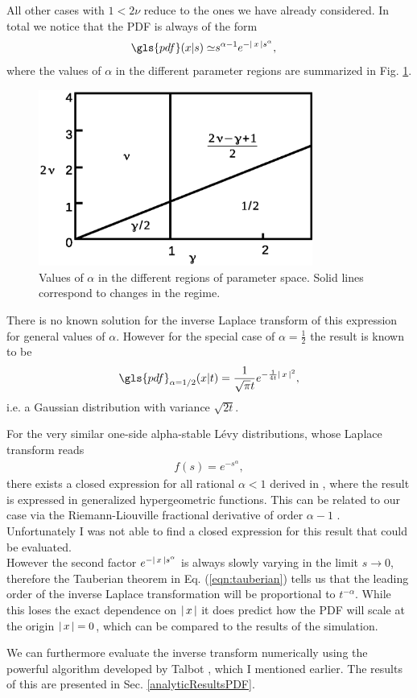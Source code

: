 All other cases with $1< 2\nu$ reduce to the ones we have already considered. In total we notice that the \gls{PDF} is always of the form 
%
\begin{align}
\gls{pdf}(x|s)\simeq & s^{\alpha-1} e^{-\abs{x} s^{\alpha}} ,
\end{align}
%
where the values of $\alpha$ in the different parameter regions are summarized in Fig. \ref{fig:alphaValuesPDF}.
%
\begin{figure}[h!]
\begin{center}
\includegraphics[width=90mm]{pics/alphaValuesPDF.eps}
\caption{Values of $\alpha$ in the different regions of parameter space. Solid lines correspond to changes in the regime.
\label{fig:alphaValuesPDF} }
\end{center}
\end{figure} 
%
There is no known solution for the inverse Laplace transform of this expression for general values of $\alpha$. However for the special case of $\alpha = \frac{1}{2} $ the result is known to be
%
\begin{align}
\gls{pdf}_{\alpha=1/2}(x|t) = \frac{1}{\sqrt{\pi}t}e^{-\frac{1}{4t}\abs{x}^2} ,
\end{align}
%
i.e. a Gaussian distribution with variance $\sqrt{2t}$. 

For the very similar one-side alpha-stable L\'evy distributions, whose Laplace transform reads
%
\begin{align}
f(s) = e^{-s^{\alpha}},
\end{align}
%
there exists a closed expression for all rational $\alpha<1$ derived in \cite{penson2010}, 
where the result is expressed in generalized hypergeometric functions. This can be related to our case via the Riemann-Liouville fractional derivative of order $\alpha-1$ 
\cite{mathai2009}. 
Unfortunately I was not able to find a closed expression for this result that could be evaluated.\\
However the second factor $e^{-\left|\,x\,\right|s^{\alpha}}$ is always slowly varying in the limit $s \to 0$, therefore the Tauberian theorem in Eq. (\ref{eqn:tauberian}) tells us that the leading order of the inverse Laplace transformation will be proportional to $t^{-\alpha}$. While this loses the exact dependence on $\left|\,x\,\right|$ it does predict how the \gls{PDF} will scale at the origin $\left|\,x\,\right|=0$, which can be compared to the results of the simulation.

We can furthermore evaluate the inverse transform numerically using the powerful algorithm developed by Talbot 
\cite{talbot1979}, 
which I mentioned earlier. The results of this are presented in Sec. \ref{analyticResultsPDF}.